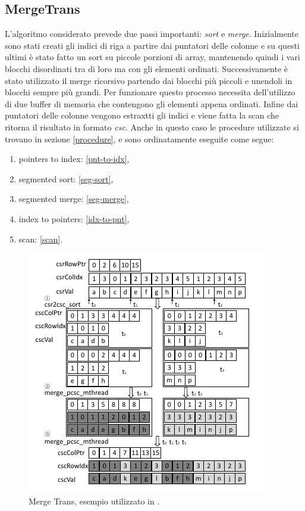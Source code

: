 \documentclass[]{IEEEtran}
\begin{document}
	\subsection{MergeTrans}
	L'algoritmo considerato prevede due passi importanti: \textit{sort} e \textit{merge}.
	Inizialmente sono stati creati gli indici di riga a partire dai puntatori delle colonne e su questi ultimi è stato fatto un sort su piccole porzioni di array, mantenendo quindi i vari blocchi disordinati tra di loro ma con gli elementi ordinati. Successivamente è stato utilizzato il merge ricorsivo partendo dai blocchi più piccoli e unendoli in blocchi sempre più grandi. Per funzionare questo processo necessita dell'utilizzo di due buffer di memoria che contengono gli elementi appena ordinati. Infine dai puntatori delle colonne vengono estraxtti gli indici e viene fatta la scan che ritorna il risultato in formato \textit{csc}. \newline
	Anche in questo caso le procedure utilizzate si trovano in sezione \ref{procedure}, e sono ordinatamente eseguite come segue:
	\begin{enumerate}
		\item pointers to index: \ref{pnt-to-idx},
		\item segmented sort: \ref{seg-sort},
		\item segmented merge: \ref{seg-merge},
		\item index to pointers: \ref{idx-to-pnt},
		\item scan: \ref{scan}.
	\end{enumerate}
	
	\begin{figure}[H]
		\includegraphics[scale=0.6]{mergetrans.png}
		\caption{Merge Trans, esempio utilizzato in \cite{parallelTrans}.}
		\label{mergetrans}
	\end{figure}
	
\end{document}
